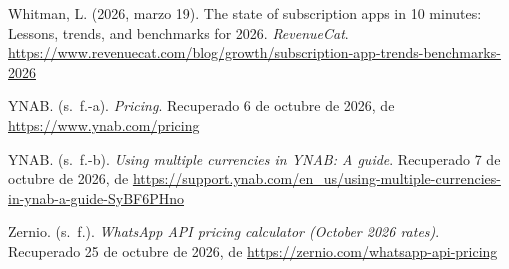\begin{CSLReferences}{1}{0}
Whitman, L. (2026, marzo 19). The state of subscription apps in 10
minutes: Lessons, trends, and benchmarks for 2026. \emph{RevenueCat}.
\url{https://www.revenuecat.com/blog/growth/subscription-app-trends-benchmarks-2026}

YNAB. (s.~f.-a). \emph{Pricing}. Recuperado 6 de octubre de 2026, de
\url{https://www.ynab.com/pricing}

YNAB. (s.~f.-b). \emph{Using multiple currencies in YNAB: A guide}.
Recuperado 7 de octubre de 2026, de
\url{https://support.ynab.com/en_us/using-multiple-currencies-in-ynab-a-guide-SyBF6PHno}

Zernio. (s.~f.). \emph{WhatsApp API pricing calculator (October 2026
rates)}. Recuperado 25 de octubre de 2026, de
\url{https://zernio.com/whatsapp-api-pricing}

\end{CSLReferences}
